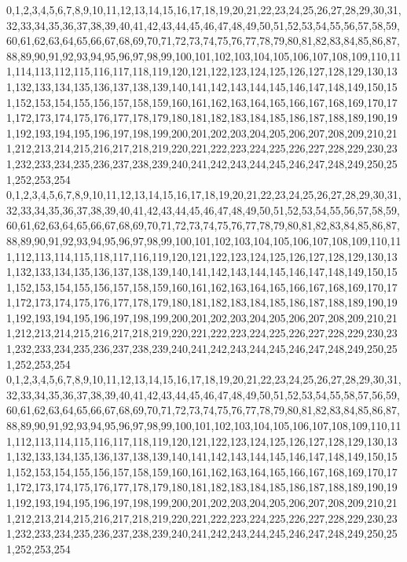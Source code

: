 \documentclass[12pt]{article}
\begin{document}
{0,1,2,3,4,5,6,7,8,9,10,11,12,13,14,15,16,17,18,19,20,21,22,23,24,25,26,27,28,29,30,31,32,33,34,35,36,37,38,39,40,41,42,43,44,45,46,47,48,49,50,51,52,53,54,55,56,57,58,59,60,61,62,63,64,65,66,67,68,69,70,71,72,73,74,75,76,77,78,79,80,81,82,83,84,85,86,87,88,89,90,91,92,93,94,95,96,97,98,99,100,101,102,103,104,105,106,107,108,109,110,111,114,113,112,115,116,117,118,119,120,121,122,123,124,125,126,127,128,129,130,131,132,133,134,135,136,137,138,139,140,141,142,143,144,145,146,147,148,149,150,151,152,153,154,155,156,157,158,159,160,161,162,163,164,165,166,167,168,169,170,171,172,173,174,175,176,177,178,179,180,181,182,183,184,185,186,187,188,189,190,191,192,193,194,195,196,197,198,199,200,201,202,203,204,205,206,207,208,209,210,211,212,213,214,215,216,217,218,219,220,221,222,223,224,225,226,227,228,229,230,231,232,233,234,235,236,237,238,239,240,241,242,243,244,245,246,247,248,249,250,251,252,253,254\\
0,1,2,3,4,5,6,7,8,9,10,11,12,13,14,15,16,17,18,19,20,21,22,23,24,25,26,27,28,29,30,31,32,33,34,35,36,37,38,39,40,41,42,43,44,45,46,47,48,49,50,51,52,53,54,55,56,57,58,59,60,61,62,63,64,65,66,67,68,69,70,71,72,73,74,75,76,77,78,79,80,81,82,83,84,85,86,87,88,89,90,91,92,93,94,95,96,97,98,99,100,101,102,103,104,105,106,107,108,109,110,111,112,113,114,115,118,117,116,119,120,121,122,123,124,125,126,127,128,129,130,131,132,133,134,135,136,137,138,139,140,141,142,143,144,145,146,147,148,149,150,151,152,153,154,155,156,157,158,159,160,161,162,163,164,165,166,167,168,169,170,171,172,173,174,175,176,177,178,179,180,181,182,183,184,185,186,187,188,189,190,191,192,193,194,195,196,197,198,199,200,201,202,203,204,205,206,207,208,209,210,211,212,213,214,215,216,217,218,219,220,221,222,223,224,225,226,227,228,229,230,231,232,233,234,235,236,237,238,239,240,241,242,243,244,245,246,247,248,249,250,251,252,253,254\\
0,1,2,3,4,5,6,7,8,9,10,11,12,13,14,15,16,17,18,19,20,21,22,23,24,25,26,27,28,29,30,31,32,33,34,35,36,37,38,39,40,41,42,43,44,45,46,47,48,49,50,51,52,53,54,55,58,57,56,59,60,61,62,63,64,65,66,67,68,69,70,71,72,73,74,75,76,77,78,79,80,81,82,83,84,85,86,87,88,89,90,91,92,93,94,95,96,97,98,99,100,101,102,103,104,105,106,107,108,109,110,111,112,113,114,115,116,117,118,119,120,121,122,123,124,125,126,127,128,129,130,131,132,133,134,135,136,137,138,139,140,141,142,143,144,145,146,147,148,149,150,151,152,153,154,155,156,157,158,159,160,161,162,163,164,165,166,167,168,169,170,171,172,173,174,175,176,177,178,179,180,181,182,183,184,185,186,187,188,189,190,191,192,193,194,195,196,197,198,199,200,201,202,203,204,205,206,207,208,209,210,211,212,213,214,215,216,217,218,219,220,221,222,223,224,225,226,227,228,229,230,231,232,233,234,235,236,237,238,239,240,241,242,243,244,245,246,247,248,249,250,251,252,253,254\\
}
\end{document}
